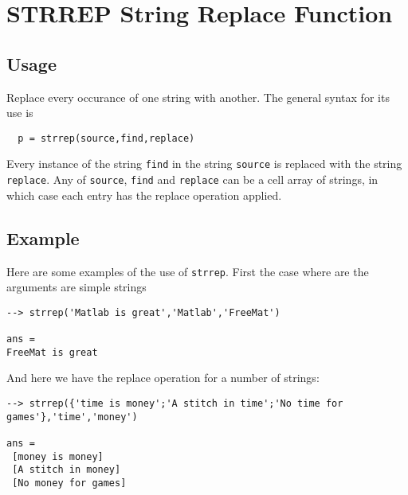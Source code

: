 \section{STRREP String Replace Function}

\subsection{Usage}

Replace every occurance of one string with another.  The
general syntax for its use is
\begin{verbatim}
  p = strrep(source,find,replace)
\end{verbatim}
Every instance of the string \verb|find| in the string \verb|source| is
replaced with the string \verb|replace|.  Any of \verb|source|, \verb|find|
and \verb|replace| can be a cell array of strings, in which case
each entry has the replace operation applied.
\subsection{Example}

Here are some examples of the use of \verb|strrep|.  First the case
where are the arguments are simple strings
\begin{verbatim}
--> strrep('Matlab is great','Matlab','FreeMat')

ans = 
FreeMat is great
\end{verbatim}
And here we have the replace operation for a number of strings:
\begin{verbatim}
--> strrep({'time is money';'A stitch in time';'No time for games'},'time','money')

ans = 
 [money is money] 
 [A stitch in money] 
 [No money for games] 
\end{verbatim}

